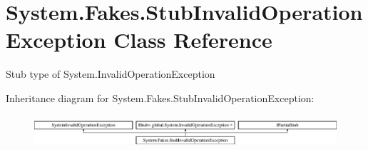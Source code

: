 \hypertarget{class_system_1_1_fakes_1_1_stub_invalid_operation_exception}{\section{System.\-Fakes.\-Stub\-Invalid\-Operation\-Exception Class Reference}
\label{class_system_1_1_fakes_1_1_stub_invalid_operation_exception}
}


Stub type of System.\-Invalid\-Operation\-Exception 


Inheritance diagram for System.\-Fakes.\-Stub\-Invalid\-Operation\-Exception\-:\begin{figure}[H]
\begin{center}
\leavevmode
\includegraphics[height=1.236203cm]{class_system_1_1_fakes_1_1_stub_invalid_operation_exception}
\end{center}
\end{figure}
